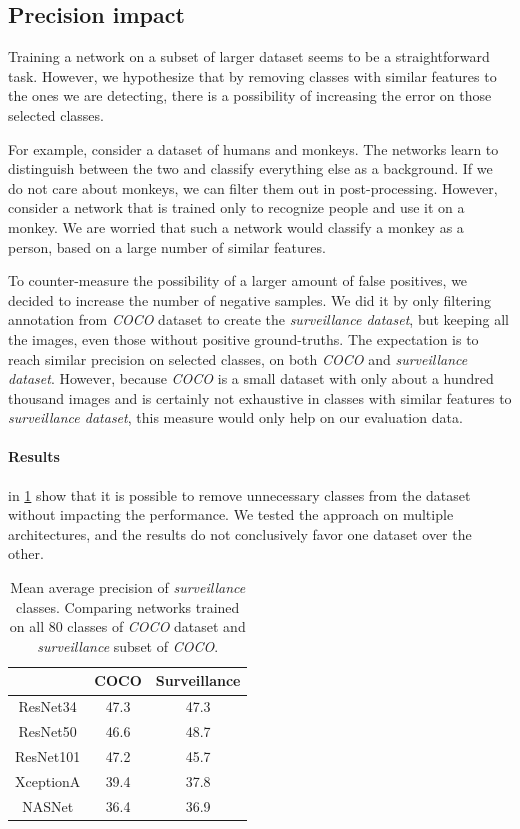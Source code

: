 \subsection{Precision impact}
Training a network on a subset of larger dataset seems to be a straightforward task. However, we hypothesize that by removing classes with similar features to the ones we are detecting, there is a possibility of increasing the error on those selected classes. 

For example, consider a dataset of humans and monkeys. The networks learn to distinguish between the two and classify everything else as a background. If we do not care about monkeys, we can filter them out in post-processing. However, consider a network that is trained only to recognize people and use it on a monkey. We are worried that such a network would classify a monkey as a person, based on a large number of similar features. 

To counter-measure the possibility of a larger amount of false positives, we decided to increase the number of negative samples. We did it by only filtering annotation from \textit{COCO} dataset to create the \textit{surveillance dataset}, but keeping all the images, even those without positive ground-truths. The expectation is to reach similar precision on selected classes, on both \textit{COCO} and \textit{surveillance dataset}. However, because \textit{COCO} is a small dataset with only about a hundred thousand images and is certainly not exhaustive in classes with similar features to \textit{surveillance dataset}, this measure would only help on our evaluation data.

\paragraph{Results} in \cref{tab:ssdcocosurv} show that it is possible to remove unnecessary classes from the dataset without impacting the performance. We tested the approach on multiple architectures, and the results do not conclusively favor one dataset over the other. 

\begin{table}[]
    \centering
    \begin{tabular}{c|c|c}
         & COCO & Surveillance  \\
         \hline
        ResNet34 & 47.3 & 47.3 \\
        ResNet50 & 46.6 & 48.7 \\
        ResNet101 & 47.2 & 45.7 \\
        XceptionA & 39.4 & 37.8 \\
        NASNet & 36.4 & 36.9 
    \end{tabular}
    \caption[SSD's precision comparison between COCO and surveillance datasets]{Mean average precision of \textit{surveillance} classes. Comparing networks trained on all 80 classes of \textit{COCO} dataset and \textit{surveillance} subset of \textit{COCO}.}
    \label{tab:ssdcocosurv}
\end{table}

